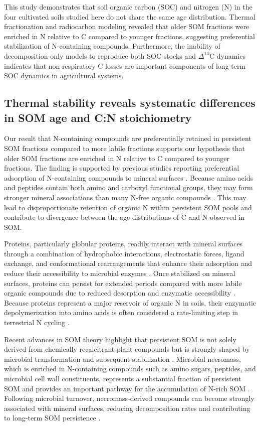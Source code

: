 \documentclass[bg, manuscript]{copernicus}
\begin{document}
This study demonstrates that soil organic carbon (SOC) and nitrogen (N) in the four cultivated soils studied here do not share the same age distribution. Thermal fractionation and radiocarbon modeling revealed that older SOM fractions were enriched in N relative to C compared to younger fractions, suggesting preferential stabilization of N-containing compounds. Furthermore, the inability of decomposition-only models to reproduce both SOC stocks and $\Delta^{14}\text{C}$ dynamics indicates that non-respiratory C losses are important components of long-term SOC dynamics in agricultural systems.

\subsection{Thermal stability reveals systematic differences in SOM age and C:N stoichiometry}  
Our result that N-containing compounds are preferentially retained in persistent SOM fractions compared to more labile fractions supports our hypothesis that older SOM fractions are enriched in N relative to C compared to younger fractions. The finding is supported by previous studies reporting preferential adsorption of N-containing compounds to mineral surfaces \citep{Cao2011, Kopittke2018, Daly2021}. Because amino acids and peptides contain both amino and carboxyl functional groups, they may form stronger mineral associations than many N-free organic compounds \citep{Spohn2024}. This may lead to disproportionate retention of organic N within persistent SOM pools and contribute to divergence between the age distributions of C and N observed in SOM.

Proteins, particularly globular proteins, readily interact with mineral surfaces through a combination of hydrophobic interactions, electrostatic forces, ligand exchange, and conformational rearrangements that enhance their adsorption and reduce their accessibility to microbial enzymes \citep{Haynes1994, Yu2002}. Once stabilized on mineral surfaces, proteins can persist for extended periods compared with more labile organic compounds due to reduced desorption and enzymatic accessibility \citep{Demarchi2016}. Because proteins represent a major reservoir of organic N in soils, their enzymatic depolymerization into amino acids is often considered a rate-limiting step in terrestrial N cycling \citep{Jan2009}.

Recent advances in SOM theory highlight that persistent SOM is not solely derived from chemically recalcitrant plant compounds but is strongly shaped by microbial transformation and subsequent stabilization \citep{Liang2019}. Microbial necromass, which is enriched in N-containing compounds such as amino sugars, peptides, and microbial cell wall constituents, represents a substantial fraction of persistent SOM and provides an important pathway for the accumulation of N-rich SOM \citep{Miltner2012}. Following microbial turnover, necromass-derived compounds can become strongly associated with mineral surfaces, reducing decomposition rates and contributing to long-term SOM persistence \citep{Kallenbach2016}.
\end{document}
